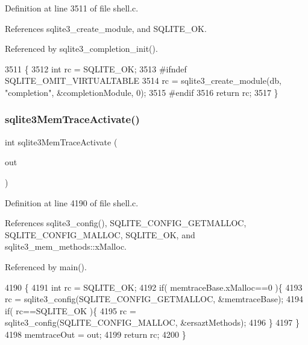 Definition at line 3511 of file shell.\+c.



References sqlite3\+\_\+create\+\_\+module, and S\+Q\+L\+I\+T\+E\+\_\+\+OK.



Referenced by sqlite3\+\_\+completion\+\_\+init().


\begin{DoxyCode}
3511                                           \{
3512   \textcolor{keywordtype}{int} rc = SQLITE_OK;
3513 \textcolor{preprocessor}{#ifndef SQLITE\_OMIT\_VIRTUALTABLE}
3514   rc = sqlite3_create_module(db, \textcolor{stringliteral}{"completion"}, &completionModule, 0);
3515 \textcolor{preprocessor}{#endif}
3516   \textcolor{keywordflow}{return} rc;
3517 \}
\end{DoxyCode}
\mbox{\label{shell_8c_aac109a05fd053ec0ac1bd71c91578a76}} 
\subsubsection{sqlite3\+Mem\+Trace\+Activate()}
{\footnotesize\ttfamily int sqlite3\+Mem\+Trace\+Activate (\begin{DoxyParamCaption}\item[{F\+I\+LE $\ast$}]{out }\end{DoxyParamCaption})}



Definition at line 4190 of file shell.\+c.



References sqlite3\+\_\+config(), S\+Q\+L\+I\+T\+E\+\_\+\+C\+O\+N\+F\+I\+G\+\_\+\+G\+E\+T\+M\+A\+L\+L\+OC, S\+Q\+L\+I\+T\+E\+\_\+\+C\+O\+N\+F\+I\+G\+\_\+\+M\+A\+L\+L\+OC, S\+Q\+L\+I\+T\+E\+\_\+\+OK, and sqlite3\+\_\+mem\+\_\+methods\+::x\+Malloc.



Referenced by main().


\begin{DoxyCode}
4190                                       \{
4191   \textcolor{keywordtype}{int} rc = SQLITE_OK;
4192   \textcolor{keywordflow}{if}( memtraceBase.xMalloc==0 )\{
4193     rc = sqlite3_config(SQLITE_CONFIG_GETMALLOC, &memtraceBase);
4194     \textcolor{keywordflow}{if}( rc==SQLITE_OK )\{
4195       rc = sqlite3_config(SQLITE_CONFIG_MALLOC, &ersaztMethods);
4196     \}
4197   \}
4198   memtraceOut = out;
4199   \textcolor{keywordflow}{return} rc;
4200 \}
\end{DoxyCode}
\mbox{\label{shell_8c_a79daca3800046e8ae61b83ad411980eb}} 
